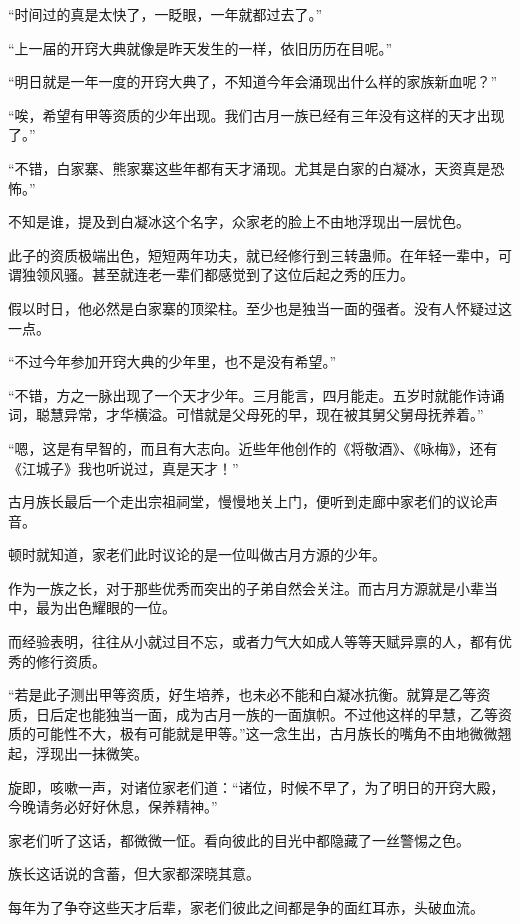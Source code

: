 \begin{this_body}
“时间过的真是太快了，一眨眼，一年就都过去了。”

“上一届的开窍大典就像是昨天发生的一样，依旧历历在目呢。”

“明日就是一年一度的开窍大典了，不知道今年会涌现出什么样的家族新血呢？”

“唉，希望有甲等资质的少年出现。我们古月一族已经有三年没有这样的天才出现了。”

“不错，白家寨、熊家寨这些年都有天才涌现。尤其是白家的白凝冰，天资真是恐怖。”

不知是谁，提及到白凝冰这个名字，众家老的脸上不由地浮现出一层忧色。

此子的资质极端出色，短短两年功夫，就已经修行到三转蛊师。在年轻一辈中，可谓独领风骚。甚至就连老一辈们都感觉到了这位后起之秀的压力。

假以时日，他必然是白家寨的顶梁柱。至少也是独当一面的强者。没有人怀疑过这一点。

“不过今年参加开窍大典的少年里，也不是没有希望。”

“不错，方之一脉出现了一个天才少年。三月能言，四月能走。五岁时就能作诗诵词，聪慧异常，才华横溢。可惜就是父母死的早，现在被其舅父舅母抚养着。”

“嗯，这是有早智的，而且有大志向。近些年他创作的《将敬酒》、《咏梅》，还有《江城子》我也听说过，真是天才！”

古月族长最后一个走出宗祖祠堂，慢慢地关上门，便听到走廊中家老们的议论声音。

顿时就知道，家老们此时议论的是一位叫做古月方源的少年。

作为一族之长，对于那些优秀而突出的子弟自然会关注。而古月方源就是小辈当中，最为出色耀眼的一位。

而经验表明，往往从小就过目不忘，或者力气大如成人等等天赋异禀的人，都有优秀的修行资质。

“若是此子测出甲等资质，好生培养，也未必不能和白凝冰抗衡。就算是乙等资质，日后定也能独当一面，成为古月一族的一面旗帜。不过他这样的早慧，乙等资质的可能性不大，极有可能就是甲等。”这一念生出，古月族长的嘴角不由地微微翘起，浮现出一抹微笑。

旋即，咳嗽一声，对诸位家老们道：“诸位，时候不早了，为了明日的开窍大殿，今晚请务必好好休息，保养精神。”

家老们听了这话，都微微一怔。看向彼此的目光中都隐藏了一丝警惕之色。

族长这话说的含蓄，但大家都深晓其意。

每年为了争夺这些天才后辈，家老们彼此之间都是争的面红耳赤，头破血流。


\end{this_body}
